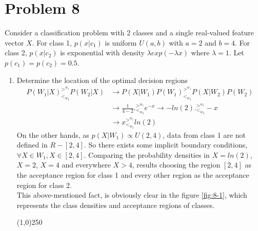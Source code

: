 \documentclass[12pt]{article}
\newcommand{\gl}{^{>^{w_1}}_{<_{w_2}}}
\begin{document}
\section{Problem 8}
Consider a classification problem with 2 classes and a single real-valued feature vector $X$. For class
1, $p(x | c_1 )$ is uniform $U(a, b)$ with $a = 2$ and $b = 4$. For class 2, $p(x|c_2 )$ is exponential with density $\lambda exp(-\lambda x)$ where $\lambda = 1$. Let $p(c_1) = p(c_2) = 0.5$.
\begin{enumerate}
\item Determine the location of the optimal decision regions
\begin{align*}
P(W_1|X)\gl P(W_2|X) &\rightarrow  P(X|W_1)P(W_1)\gl P(X|W_2)P(W_2) \\
&\rightarrow \frac{1}{4 - 2} .\gl e^{-x} \rightarrow -ln(2) .\gl -x \\
&\rightarrow x\gl ln(2)
\end{align*}
On the other hands, as $p(X|W_1) \propto U(2,4)$, data from class 1 are not defined in $R - [2,4]$. So there exists some implicit boundary conditions, $\forall X \in W_1, X \in [2,4]$. Comparing the probability densities in $X = ln(2)$,$X = 2$, $X = 4$ and everywhere $X > 4$, results choosing the region $[2, 4]$ as the acceptance region for class 1 and every other region as the acceptance region for class 2.\\
This above-mentioned fact, is obviously clear in the figure \ref{fig:8-1}, which represents the class densities and acceptance regions of classes.

\begin{center}
\line(1,0){250}
\end{center}


\end{enumerate}
\end{document}

